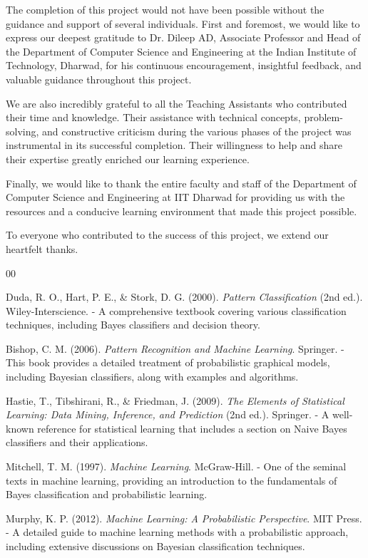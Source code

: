 \documentclass[conference]{IEEEtran}
\begin{document}
The completion of this project would not have been possible without the guidance and support of several individuals. First and foremost, we would like to express our deepest gratitude to Dr. Dileep AD, Associate Professor and Head of the Department of Computer Science and Engineering at the Indian Institute of Technology, Dharwad, for his continuous encouragement, insightful feedback, and valuable guidance throughout this project.

We are also incredibly grateful to all the Teaching Assistants who contributed their time and knowledge. Their assistance with technical concepts, problem-solving, and constructive criticism during the various phases of the project was instrumental in its successful completion. Their willingness to help and share their expertise greatly enriched our learning experience.

Finally, we would like to thank the entire faculty and staff of the Department of Computer Science and Engineering at IIT Dharwad for providing us with the resources and a conducive learning environment that made this project possible.

To everyone who contributed to the success of this project, we extend our heartfelt thanks.



\begin{thebibliography}{00}
	
	 Duda, R. O., Hart, P. E., \& Stork, D. G. (2000). \textit{Pattern Classification} (2nd ed.). Wiley-Interscience.
	- A comprehensive textbook covering various classification techniques, including Bayes classifiers and decision theory.
	
	 Bishop, C. M. (2006). \textit{Pattern Recognition and Machine Learning}. Springer.
	- This book provides a detailed treatment of probabilistic graphical models, including Bayesian classifiers, along with examples and algorithms.
	
	 Hastie, T., Tibshirani, R., \& Friedman, J. (2009). \textit{The Elements of Statistical Learning: Data Mining, Inference, and Prediction} (2nd ed.). Springer.
	- A well-known reference for statistical learning that includes a section on Naive Bayes classifiers and their applications.
	
	 Mitchell, T. M. (1997). \textit{Machine Learning}. McGraw-Hill.
	- One of the seminal texts in machine learning, providing an introduction to the fundamentals of Bayes classification and probabilistic learning.
	
	 Murphy, K. P. (2012). \textit{Machine Learning: A Probabilistic Perspective}. MIT Press.
	- A detailed guide to machine learning methods with a probabilistic approach, including extensive discussions on Bayesian classification techniques.
	
\end{thebibliography}
\end{document}
